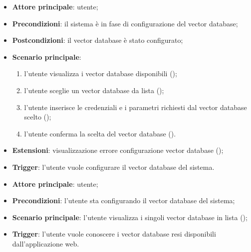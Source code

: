 \documentclass[10pt, a4paper]{article}
\begin{document}
    \begin{itemize}
        \item \textbf{Attore principale}: utente;
        \item \textbf{Precondizioni}:  il sistema è in fase di configurazione del vector database;
        \item \textbf{Postcondizioni}: il vector database è stato configurato;
        \item \textbf{Scenario principale}:
            \begin{enumerate}
                \item l’utente visualizza i vector database disponibili ();
                \item l’utente sceglie un vector database da lista ();
                \item l’utente inserisce le credenziali e i parametri richiesti dal vector database scelto ();
                \item l’utente conferma la scelta del vector database ().
            \end{enumerate}
        \item \textbf{Estensioni}: visualizzazione errore configurazione vector database ();
        \item \textbf{Trigger}: l’utente vuole configurare il vector database del sistema.
    \end{itemize}

    \begin{itemize}
        \item \textbf{Attore principale}: utente;
        \item \textbf{Precondizioni}: l’utente sta configurando il vector database del sistema;
        \item \textbf{Scenario principale}: l’utente visualizza i singoli vector database in lista ();
        \item \textbf{Trigger}: l’utente vuole conoscere i vector database resi disponibili dall’applicazione web.
    \end{itemize}
\end{document}
